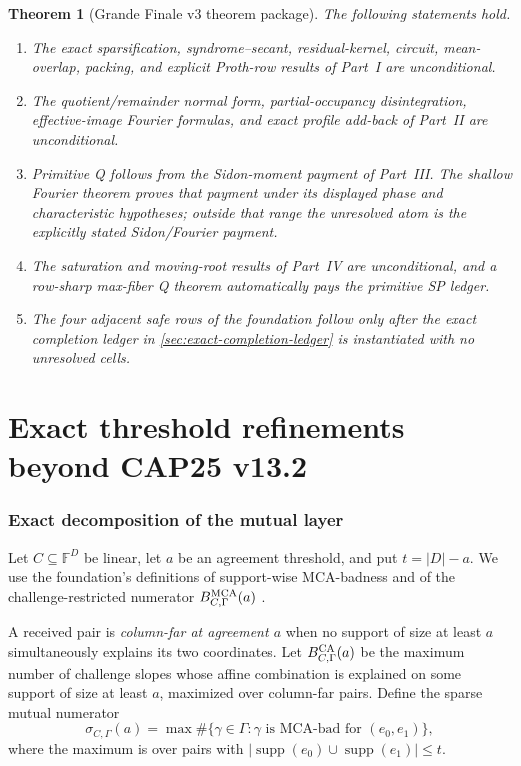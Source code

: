 \documentclass[11pt,a4paper]{amsart}
\numberwithin{equation}{section}
\newtheorem{theorem}{Theorem}[section]
\theoremstyle{remark}
\DeclareMathOperator{\supp}{supp}\DeclareMathOperator{\Fib}{Fib}\DeclareMathOperator{\Sym}{Sym}
\newcommand{\F}{\mathbb F}\newcommand{\B}{\mathbb B}\newcommand{\K}{\mathbb K}\newcommand{\Z}{\mathbb Z}
\begin{document}
\begin{theorem}[Grande Finale v3 theorem package]\label{thm:v3-package}
The following statements hold.
\begin{enumerate}[label=\textup{(\roman*)},leftmargin=*]
\item The exact sparsification, syndrome--secant, residual-kernel, circuit, mean-overlap, packing, and explicit Proth-row results of Part~I are unconditional.
\item The quotient/remainder normal form, partial-occupancy disintegration, effective-image Fourier formulas, and exact profile add-back of Part~II are unconditional.
\item Primitive Q follows from the Sidon-moment payment of Part~III.  The shallow Fourier theorem proves that payment under its displayed phase and characteristic hypotheses; outside that range the unresolved atom is the explicitly stated Sidon/Fourier payment.
\item The saturation and moving-root results of Part~IV are unconditional, and a row-sharp max-fiber Q theorem automatically pays the primitive SP ledger.
\item The four adjacent safe rows of the foundation follow only after the exact completion ledger in \cref{sec:exact-completion-ledger} is instantiated with no unresolved cells.
\end{enumerate}
\end{theorem}


\part{Exact threshold refinements beyond CAP25 v13.2}

\section{Exact decomposition of the mutual layer}\label{sec:mutual-decomposition}
Let $C\subseteq\F^D$ be linear, let $a$ be an agreement threshold, and put $t=|D|-a$.  We use the foundation's definitions of support-wise MCA-badness and of the challenge-restricted numerator $B^{\rm MCA}_{C,\Gamma}(a)$ \cite[Secs.~1--2]{CAP25v132}.

A received pair is \emph{column-far at agreement $a$} when no support of size at least $a$ simultaneously explains its two coordinates.  Let $B^{\rm CA}_{C,\Gamma}(a)$ be the maximum number of challenge slopes whose affine combination is explained on some support of size at least $a$, maximized over column-far pairs.  Define the sparse mutual numerator
\[
 \sigma_{C,\Gamma}(a)=\max\#\{\gamma\in\Gamma:\gamma\text{ is MCA-bad for }(e_0,e_1)\},
\]
where the maximum is over pairs with $|\supp(e_0)\cup\supp(e_1)|\le t$.
\end{document}
